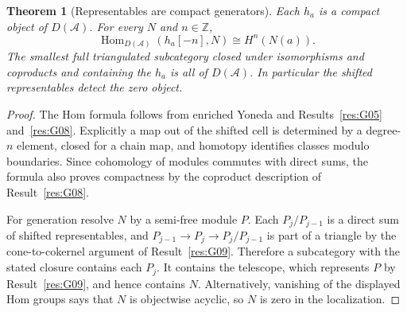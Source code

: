 \documentclass[11pt,oneside,openany]{book}
\newtheorem{theorem}{Theorem}[chapter]
\theoremstyle{definition}
\theoremstyle{remark}
\begin{document}
\begin{theorem}[Representables are compact generators]\label{res:G10}
Each \(h_a\) is a compact object of \(D(\mathcal A)\). For every
\(N\) and \(n\in\mathbb Z\),
\[
       \operatorname{Hom}_{D(\mathcal A)}(h_a[-n],N)
           \cong H^n(N(a)).
\]
The smallest full triangulated subcategory closed under
isomorphisms and coproducts and containing the \(h_a\) is all of
\(D(\mathcal A)\). In particular the shifted representables detect
the zero object.
\end{theorem}
\begin{proof}
The Hom formula follows from enriched Yoneda and
Results~\ref{res:G05} and~\ref{res:G08}. Explicitly a map out of
the shifted cell is determined by a degree-\(n\) element, closed
for a chain map, and homotopy identifies classes modulo boundaries.
Since cohomology of modules commutes with direct sums, the formula
also proves compactness by the coproduct description of
Result~\ref{res:G08}.

For generation resolve \(N\) by a semi-free module \(P\). Each
\(P_j/P_{j-1}\) is a direct sum of shifted representables, and
\(P_{j-1}\to P_j\to P_j/P_{j-1}\) is part of a triangle by the
cone-to-cokernel argument of Result~\ref{res:G09}. Therefore a
subcategory with the stated closure contains each \(P_j\).
It contains the telescope, which represents \(P\) by
Result~\ref{res:G09}, and hence contains \(N\). Alternatively,
vanishing of the displayed Hom groups says that \(N\) is
objectwise acyclic, so \(N\) is zero in the localization.
\end{proof}
\end{document}
